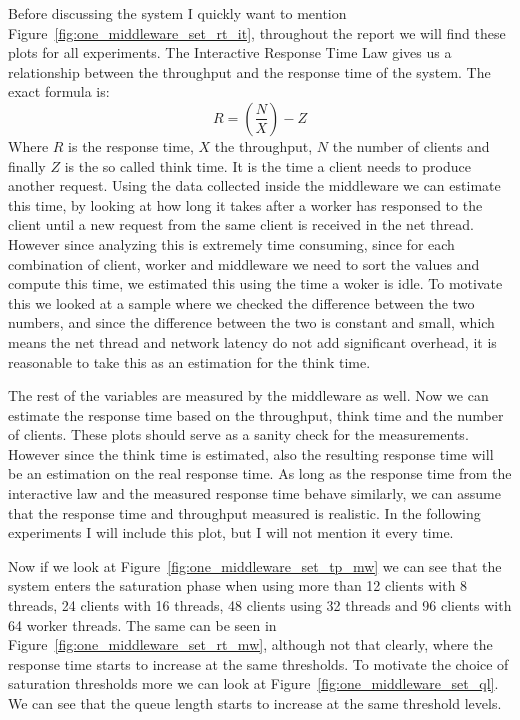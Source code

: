 \documentclass[11pt,a4paper]{article}
\begin{document}
%
Before discussing the system I quickly want to mention Figure~\ref{fig:one_middleware_set_rt_it}, throughout the report we will find these plots for all experiments.
%
The Interactive Response Time Law gives us a relationship between the throughput and the response time of the system. The exact formula is:
%
\[
R = \left(\frac{N}{X}\right) - Z
\]
%
Where $R$ is the response time, $X$ the throughput, $N$ the number of clients and finally $Z$ is the so called think time.
%
It is the time a client needs to produce another request.
%
Using the data collected inside the middleware we can estimate this time, by looking at how long it takes after a worker has responsed to the client until a new request from the same client is received in the net thread.
%
However since analyzing this is extremely time consuming, since for each combination of client, worker and middleware we need to sort the values and compute this time, we estimated this using the time a woker is idle.
%
To motivate this we looked at a sample where we checked the difference between the two numbers, and since the difference between the two is constant and small, which means the net thread and network latency do not add significant overhead, it is reasonable to take this as an estimation for the think time.
%
\par
%
The rest of the variables are measured by the middleware as well.
%
Now we can estimate the response time based on the throughput, think time and the number of clients.
%
These plots should serve as a sanity check for the measurements.
%
However since the think time is estimated, also the resulting response time will be an estimation on the real response time.
%
As long as the response time from the interactive law and the measured response time behave similarly, we can assume that the response time and throughput measured is realistic.
%
In the following experiments I will include this plot, but I will not mention it every time.
%
\par
%
Now if we look at Figure~\ref{fig:one_middleware_set_tp_mw} we can see that the system enters the saturation phase when using more than 12 clients with 8 threads, 24 clients with 16 threads, 48 clients using 32 threads and 96 clients with 64 worker threads.
%
The same can be seen in Figure~\ref{fig:one_middleware_set_rt_mw}, although not that clearly, where the response time starts to increase at the same thresholds.
%
To motivate the choice of saturation thresholds more we can look at Figure~\ref{fig:one_middleware_set_ql}.
%
We can see that the queue length starts to increase at the same threshold levels.
\end{document}
